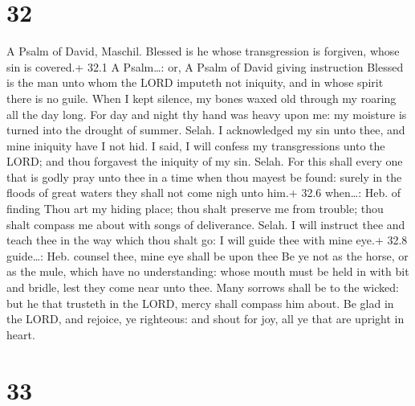 \hypertarget{section-31}{%
\section{32}\label{section-31}}

A Psalm of David, Maschil.  Blessed is he whose
transgression is forgiven, whose sin is covered.+ 32.1 A Psalm\ldots:
or, A Psalm of David giving instruction  Blessed is the man
unto whom the LORD imputeth not iniquity, and in whose spirit there is
no guile.  When I kept silence, my bones waxed old through
my roaring all the day long.  For day and night thy hand was
heavy upon me: my moisture is turned into the drought of summer. Selah.
 I acknowledged my sin unto thee, and mine iniquity have I
not hid. I said, I will confess my transgressions unto the LORD; and
thou forgavest the iniquity of my sin. Selah.  For this
shall every one that is godly pray unto thee in a time when thou mayest
be found: surely in the floods of great waters they shall not come nigh
unto him.+ 32.6 when\ldots: Heb. of finding  Thou art my
hiding place; thou shalt preserve me from trouble; thou shalt compass me
about with songs of deliverance. Selah.  I will instruct
thee and teach thee in the way which thou shalt go: I will guide thee
with mine eye.+ 32.8 guide\ldots: Heb. counsel thee, mine eye shall be
upon thee  Be ye not as the horse, or as the mule, which
have no understanding: whose mouth must be held in with bit and bridle,
lest they come near unto thee.  Many sorrows shall be to
the wicked: but he that trusteth in the LORD, mercy shall compass him
about.  Be glad in the LORD, and rejoice, ye righteous: and
shout for joy, all ye that are upright in heart.

\hypertarget{section-32}{%
\section{33}\label{section-32}}

